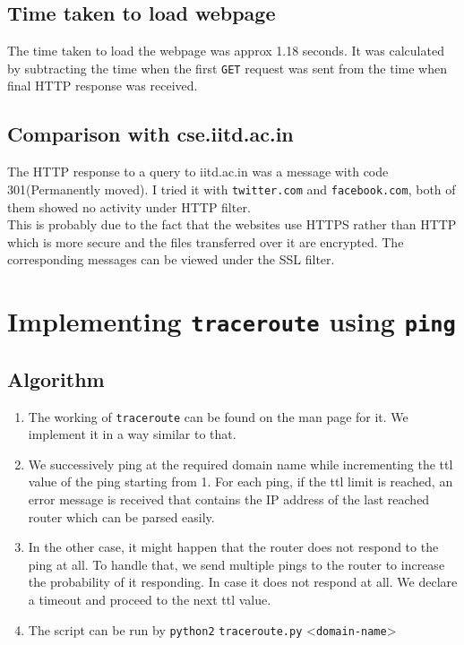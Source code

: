 \documentclass[a4paper]{article}
\begin{document}
\subsection{Time taken to load webpage}
The time taken to load the webpage was approx 1.18 seconds. It was calculated by subtracting the time when the first \texttt{GET} request was sent from the time when final HTTP response was received.
\subsection{Comparison with cse.iitd.ac.in}
The HTTP response to a query to iitd.ac.in was a message with code 301(Permanently moved). I tried it with \texttt{twitter.com} and \texttt{facebook.com}, both of them showed no activity under HTTP filter. \\
This is probably due to the fact that the websites use HTTPS rather than HTTP which is more secure and the files transferred over it are encrypted. The corresponding messages can be viewed under the SSL filter.
\section{Implementing \texttt{traceroute} using \texttt{ping}}

\subsection{Algorithm}
\begin{enumerate}
    \item The working of \texttt{traceroute} can be found on the man page for it. We implement it in a way similar to that. 
    \item We successively ping at the required domain name while incrementing the ttl value of the ping starting from 1. For each ping, if the ttl limit is reached, an error message is received that contains the IP address of the last reached router which can be parsed easily.
    \item In the other case, it might happen that the router does not respond to the ping at all. To handle that, we send multiple pings to the router to increase the probability of it responding. In case it does not respond at all. We declare a timeout and proceed to the next ttl value.
    \item The script can be run by \texttt{python2} \texttt{traceroute.py} \textless\texttt{domain-name}\textgreater
\end{enumerate}
\end{document}
